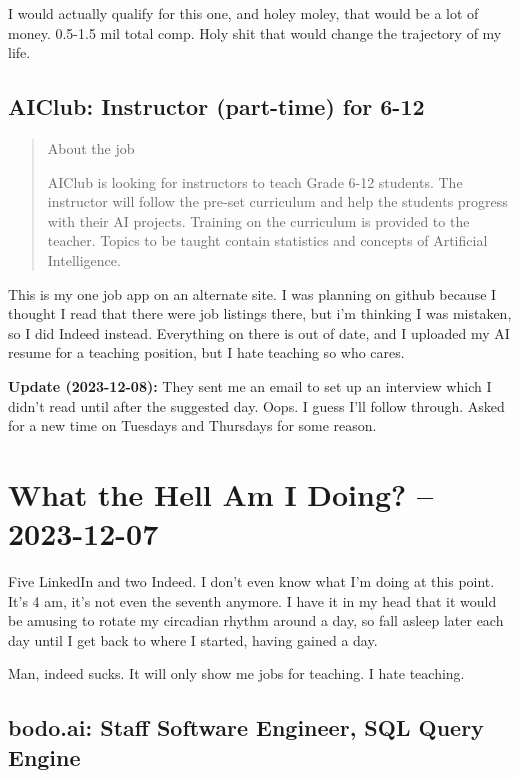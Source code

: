 \documentclass[
	letterpaper, %
	12pt, %
]{CSSullivanBusinessReport}
\begin{document}
I would actually qualify for this one, and holey moley, that would be a lot of money. 0.5-1.5 mil total comp. Holy shit that would change the trajectory of my life. 

\subsection[AIClub]{AIClub: Instructor (part-time) for 6-12}

\begin{quote}
	About the job
	
	AIClub is looking for instructors to teach Grade 6-12 students. The instructor will follow the pre-set curriculum and help the students progress with their AI projects. Training on the curriculum is provided to the teacher. Topics to be taught contain statistics and concepts of Artificial Intelligence.

\end{quote}

This is my one job app on an alternate site. I was planning on github because I thought I read that there were job listings there, but i'm thinking I was mistaken, so I did Indeed instead. Everything on there is out of date, and I uploaded my AI resume for a teaching position, but I hate teaching so who cares.  

\textbf{Update (2023-12-08):} They sent me an email to set up an interview which I didn't read until after the suggested day. Oops. I guess I'll follow through. Asked for a new time on Tuesdays and Thursdays for some reason. 


\section[7 Dec: Indeed]{What the Hell Am I Doing? -- 2023-12-07} %

Five LinkedIn and two Indeed. I don't even know what I'm doing at this point. It's 4 am, it's not even the seventh anymore. I have it in my head that it would be amusing to rotate my circadian rhythm around a day, so fall asleep later each day until I get back to where I started, having gained a day. 

Man, indeed sucks. It will only show me jobs for teaching. I hate teaching. 

\subsection[bodo.ai]{bodo.ai: Staff Software Engineer, SQL Query Engine}
\end{document}
